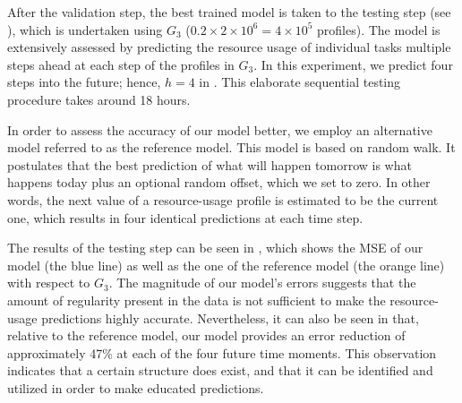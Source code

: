 After the validation step, the best trained model is taken to the testing step
(see ), which is undertaken using $G_3$ ($0.2 \times 2
\times 10^6 = 4 \times 10^5$ profiles). The model is extensively assessed by
predicting the resource usage of individual tasks multiple steps ahead at each
step of the profiles in $G_3$. In this experiment, we predict four steps into
the future; hence, $h = 4$ in . This elaborate sequential
testing procedure takes around 18 hours.

In order to assess the accuracy of our model better, we employ an alternative
model referred to as the reference model. This model is based on random walk. It
postulates that the best prediction of what will happen tomorrow is what happens
today plus an optional random offset, which we set to zero. In other words, the
next value of a resource-usage profile is estimated to be the current one, which
results in four identical predictions at each time step.

The results of the testing step can be seen in , which
shows the \ac{MSE} of our model (the blue line) as well as the one of the
reference model (the orange line) with respect to $G_3$. The magnitude of our
model's errors suggests that the amount of regularity present in the data is not
sufficient to make the resource-usage predictions highly accurate. Nevertheless,
it can also be seen in  that, relative to the reference
model, our model provides an error reduction of approximately 47\% at each of
the four future time moments. This observation indicates that a certain
structure does exist, and that it can be identified and utilized in order to
make educated predictions.

